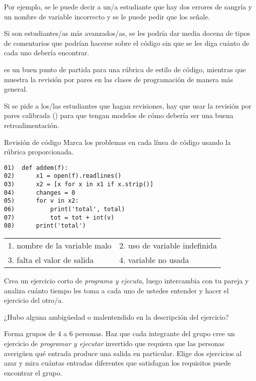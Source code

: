 Por ejemplo, 
se le puede decir a un/a estudiante que hay dos errores de sangría y un nombre de variable incorrecto y se le puede pedir que los señale.

Si son estudiantes/as más avanzados/as, se les podría dar media docena de tipos de comentarios que podrían hacerse sobre el código sin que se les diga cuánto de cada uno debería encontrar.

\cite{Steg2016b} es un buen punto de partida para una rúbrica de estilo de código, mientras que~\cite{Luxt2009} muestra la revisión por pares en las clases de programación de manera más general.

Si se pide a los/las estudiantes que hagan revisiones, hay que usar la revisión por pares calibrada () para que tengan modelos de cómo debería ser una buena retroalimentación.

\begin{aside}{Revisión de código}
 Marca los problemas en cada línea de código usando la rúbrica proporcionada.

\begin{verbatim}
01)  def addem(f):
02)      x1 = open(f).readlines()
03)      x2 = [x for x in x1 if x.strip()]
04)      changes = 0
05)      for v in x2:
06)          print('total', total)
07)          tot = tot + int(v)
08)      print('total')
\end{verbatim}

   \begin{longtable}{ll}
    1. nombre de la variable malo   & 2. uso de variable indefinida \\
    3. falta el valor de salida & 4. variable no usada
  \end{longtable}

\end{aside}



Crea un ejercicio corto de \emph{programa y ejecuta}, 
luego intercambia con tu pareja 
y analiza cuánto tiempo les toma a cada uno de ustedes entender y hacer el ejercicio del otro/a.

¿Hubo alguna ambigüedad o malentendido en la descripción del ejercicio?


Forma grupos de 4 a 6 personas.
Haz que cada integrante del grupo cree un ejercicio de \emph{programar y ejecutar} invertido que requiera que las personas averigüen qué entrada produce una salida en particular.
Elige dos ejercicios al azar 
y mira cuántas entradas diferentes que satisfagan los requisitos puede encontrar el grupo.

